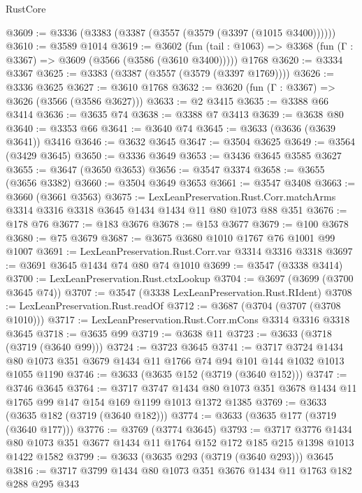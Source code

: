 \begin{lexlean}{RustCore}
\begin{coremodule}
@3609 := @3336 (@3383 (@3387 (@3557 (@3579 (@3397 (@1015 @3400))))))
@3610 := @3589 @1014
@3619 := @3602
    (fun (tail : @1063) => @3368 (fun (Γ : @3367) => @3609 (@3566 (@3586 (@3610 @3400)))))
    @1768
@3620 := @3334 @3367
@3625 := @3383 (@3387 (@3557 (@3579 (@3397 @1769))))
@3626 := @3336 @3625
@3627 := @3610 @1768
@3632 := @3620 (fun (Γ : @3367) => @3626 (@3566 (@3586 @3627)))
@3633 := @2 @3415
@3635 := @3388 @66 @3414
@3636 := @3635 @74
@3638 := @3388 @7 @3413
@3639 := @3638 @80
@3640 := @3353 @66
@3641 := @3640 @74
@3645 := @3633 (@3636 (@3639 @3641)) @3416
@3646 := @3632 @3645
@3647 := @3504 @3625
@3649 := @3564 (@3429 @3645)
@3650 := @3336 @3649
@3653 := @3436 @3645 @3585 @3627
@3655 := @3647 (@3650 @3653)
@3656 := @3547 @3374
@3658 := @3655 (@3656 @3382)
@3660 := @3504 @3649 @3653
@3661 := @3547 @3408
@3663 := @3660 (@3661 @3563)
@3675 := LexLeanPreservation.Rust.Corr.matchArms
    @3314
    @3316
    @3318
    @3645
    @1434
    @1434
    @11
    @80
    @1073
    @88
    @351
@3676 := @178 @76
@3677 := @183 @3676
@3678 := @153 @3677
@3679 := @100 @3678
@3680 := @75 @3679
@3687 := @3675 @3680 @1010 @1767 @76 @1001 @99 @1007
@3691 := LexLeanPreservation.Rust.Corr.var @3314 @3316 @3318
@3697 := @3691 @3645 @1434 @74 @80 @74 @1010
@3699 := @3547 (@3338 @3414)
@3700 := LexLeanPreservation.Rust.ctxLookup
@3704 := @3697 (@3699 (@3700 @3645 @74))
@3707 := @3547 (@3338 LexLeanPreservation.Rust.RIdent)
@3708 := LexLeanPreservation.Rust.readOf
@3712 := @3687 (@3704 (@3707 (@3708 @1010)))
@3717 := LexLeanPreservation.Rust.Corr.mCons @3314 @3316 @3318 @3645
@3718 := @3635 @99
@3719 := @3638 @11
@3723 := @3633 (@3718 (@3719 (@3640 @99)))
@3724 := @3723 @3645
@3741 := @3717
    @3724
    @1434
    @80
    @1073
    @351
    @3679
    @1434
    @11
    @1766
    @74
    @94
    @101
    @144
    @1032
    @1013
    @1055
    @1190
@3746 := @3633 (@3635 @152 (@3719 (@3640 @152)))
@3747 := @3746 @3645
@3764 := @3717
    @3747
    @1434
    @80
    @1073
    @351
    @3678
    @1434
    @11
    @1765
    @99
    @147
    @154
    @169
    @1199
    @1013
    @1372
    @1385
@3769 := @3633 (@3635 @182 (@3719 (@3640 @182)))
@3774 := @3633 (@3635 @177 (@3719 (@3640 @177)))
@3776 := @3769 (@3774 @3645)
@3793 := @3717
    @3776
    @1434
    @80
    @1073
    @351
    @3677
    @1434
    @11
    @1764
    @152
    @172
    @185
    @215
    @1398
    @1013
    @1422
    @1582
@3799 := @3633 (@3635 @293 (@3719 (@3640 @293))) @3645
@3816 := @3717
    @3799
    @1434
    @80
    @1073
    @351
    @3676
    @1434
    @11
    @1763
    @182
    @288
    @295
    @343

\end{coremodule}
\end{lexlean}
